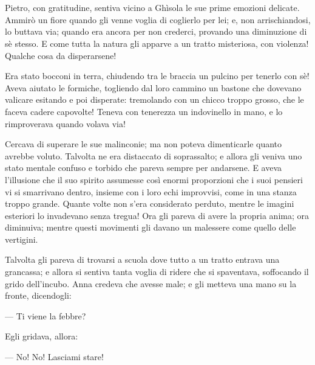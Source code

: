 \chapter{}

Pietro, con gratitudine, sentiva vicino a Ghìsola le sue prime emozioni delicate. Ammirò un fiore quando gli venne voglia di coglierlo per lei; e, non arrischiandosi, lo buttava via; quando era ancora per non crederci, provando una diminuzione di sè stesso. E come tutta la natura gli apparve a un tratto misteriosa, con violenza! Qualche cosa da disperarsene!

Era stato bocconi in terra, chiudendo tra le braccia un pulcino per tenerlo con sè! Aveva aiutato le formiche, togliendo dal loro cammino un bastone che dovevano valicare esitando e poi disperate: tremolando con un chicco troppo grosso, che le faceva cadere capovolte! Teneva con tenerezza un indovinello in mano, e lo rimproverava quando volava via!

Cercava di superare le sue malinconie; ma non poteva dimenticarle quanto avrebbe voluto. Talvolta ne era distaccato di soprassalto; e allora gli veniva uno stato mentale confuso e torbido che pareva sempre per andarsene. E aveva l’illusione che il suo spirito assumesse così enormi proporzioni che i suoi pensieri vi si smarrivano dentro, insieme con i loro echi improvvisi, come in una stanza troppo grande. Quante volte non s’era considerato perduto, mentre le imagini esteriori lo invadevano senza tregua! Ora gli pareva di avere la propria anima; ora diminuiva; mentre questi movimenti gli davano un malessere come quello delle vertigini.

Talvolta gli pareva di trovarsi a scuola dove tutto a un tratto entrava una grancassa; e allora si sentiva tanta voglia di ridere che si spaventava, soffocando il grido dell’incubo. Anna credeva che avesse male; e gli metteva una mano su la fronte, dicendogli:

— Ti viene la febbre?

Egli gridava, allora:

— No! No! Lasciami stare!

